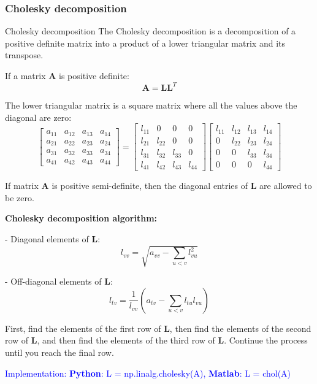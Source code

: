 \subsubsection{Cholesky decomposition}
\begin{frame}{Cholesky decomposition}
\vspace{-7pt}
The Cholesky decomposition is a decomposition of a positive definite matrix into a product of a lower triangular matrix and its transpose.

If a matrix \(\mathbf{A}\) is positive definite:
\[
\mathbf{A} = \mathbf{L} \mathbf{L}^T 
\]

The lower triangular matrix is a square matrix where all the values above the diagonal are zero:
\vspace{-7pt}
\[
\begin{bmatrix}
a_{11} & a_{12} & a_{13} & a_{14} \\
a_{21} & a_{22} & a_{23} & a_{24} \\
a_{31} & a_{32} & a_{33} & a_{34} \\
a_{41} & a_{42} & a_{43} & a_{44}
\end{bmatrix}
=
\begin{bmatrix}
l_{11} & 0 & 0 & 0 \\
l_{21} & l_{22} & 0 & 0 \\
l_{31} & l_{32} & l_{33} & 0 \\
l_{41} & l_{42} & l_{43} & l_{44}
\end{bmatrix}
\begin{bmatrix}
l_{11} & l_{12} & l_{13} & l_{14} \\
0 & l_{22} & l_{23} & l_{24} \\
0 & 0 & l_{33} & l_{34} \\
0 & 0 & 0 & l_{44}
\end{bmatrix}
\]

If matrix \(\mathbf{A}\) is positive semi-definite, then the diagonal entries of \(\mathbf{L}\) are allowed to be zero.

\textbf{Cholesky decomposition algorithm:}

- Diagonal elements of \(\mathbf{L}\):
\[
l_{vv} = \sqrt{a_{vv} - \sum_{u<v} l_{vu}^2}
\]

- Off-diagonal elements of \(\mathbf{L}\):
\[
l_{tv} = \frac{1}{l_{vv}} \left( a_{tv} - \sum_{u<v} l_{tu} l_{vu} \right)
\]

First, find the elements of the first row of \(\mathbf{L}\), then find the elements of the second row of \(\mathbf{L}\), and then find the elements of the third row of \(\mathbf{L}\). Continue the process until you reach the final row.

\textcolor{blue}{Implementation: \textbf{Python}: L = np.linalg.cholesky(A), \textbf{Matlab}: L = chol(A)}    
\end{frame}


